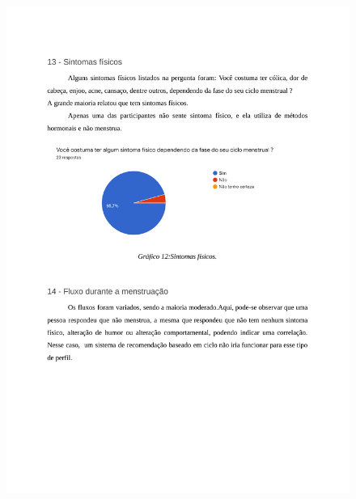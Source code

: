 \begin{apendicesenv}
        \begin{figure}[ht]
            \centering
            \includegraphics[keepaspectratio=true,scale=0.7]{figuras/Tab11.pdf}
        \end{figure}
        

\end{apendicesenv}
